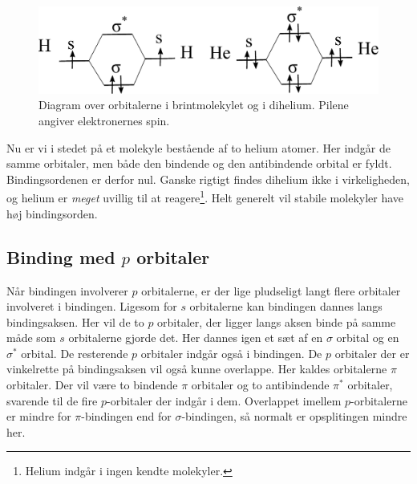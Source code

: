 \documentclass[../../Atom-ogMolekylefysik.tex]{subfiles}
\begin{document}
\begin{figure}[h!]
    \centering
    \includegraphics[width = \textwidth]{Atom-ogMolekylefysik/billeder/simpeltMOD.pdf}
    \caption{Diagram over orbitalerne i brintmolekylet og i dihelium. Pilene angiver elektronernes spin.}
    \label{fig:simpeltMOD}
\end{figure}

Nu er vi i stedet på et molekyle bestående af to helium atomer. Her indgår de samme orbitaler, men både den bindende og den antibindende orbital er fyldt. Bindingsordenen er derfor nul. Ganske rigtigt findes dihelium ikke i virkeligheden, og helium er {\em meget} uvillig til at reagere\footnote{Helium indgår i ingen kendte molekyler.}. Helt generelt vil stabile molekyler have høj bindingsorden.
\subsection{Binding med $p$ orbitaler}
Når bindingen involverer $p$ orbitalerne, er der lige pludseligt langt flere orbitaler involveret i bindingen. Ligesom for $s$ orbitalerne kan bindingen dannes langs bindingsaksen. Her vil de to $p$ orbitaler, der ligger langs aksen binde på samme måde som $s$ orbitalerne gjorde det. Her dannes igen et sæt af en $\sigma$ orbital og en $\sigma^*$ orbital. De resterende $p$ orbitaler indgår også i bindingen. De $p$ orbitaler der er vinkelrette på bindingsaksen vil også kunne overlappe. Her kaldes orbitalerne $\pi$ orbitaler. Der vil være to bindende $\pi$ orbitaler og to antibindende $\pi^*$ orbitaler, svarende til de fire $p$-orbitaler der indgår i dem. Overlappet imellem $p$-orbitalerne er mindre for $\pi$-bindingen end for $\sigma$-bindingen, så normalt er opsplitingen mindre her.
\end{document}
